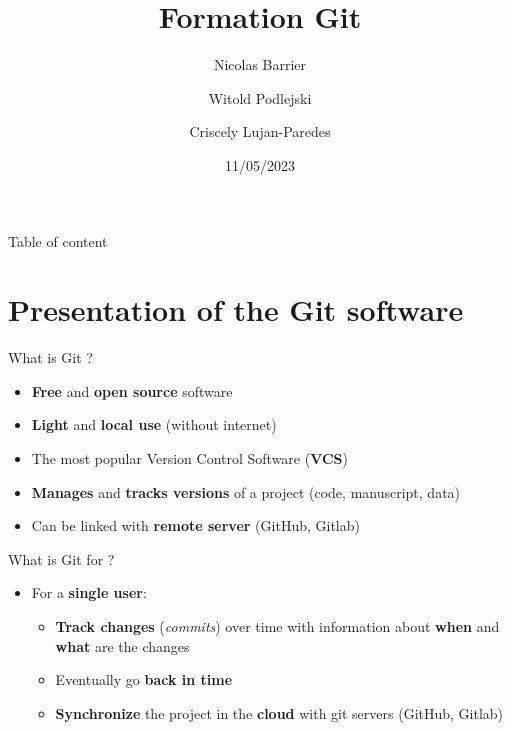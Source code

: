 \documentclass[10pt]{beamer}
\title{Formation Git}
\date{11/05/2023}
\author{Nicolas Barrier \and Witold Podlejski \and Criscely
Lujan-Paredes}
\date{}
\begin{document}
\frame{\titlepage}
\ifdefined\Shaded\renewenvironment{Shaded}{\begin{tcolorbox}[sharp corners, frame hidden, boxrule=0pt, breakable, borderline west={3pt}{0pt}{shadecolor}, enhanced, interior hidden]}{\end{tcolorbox}}\fi


\begin{frame}{Table of content}
\protect\hypertarget{table-of-content}{}
 \tableofcontents
\end{frame}


\section{Presentation of the Git software}

\begin{frame}{What is Git ?}
\protect\hypertarget{what-is-git}{}
\begin{itemize}
\item
  \textbf{Free} and \textbf{open source} software
\item
  \textbf{Light} and \textbf{local use} (without internet)
\item
  The most popular Version Control Software (\textbf{VCS})
\item
  \textbf{Manages} and \textbf{tracks versions} of a project (code,
  manuscript, data)
\item
  Can be linked with \textbf{remote server} (GitHub, Gitlab)
\end{itemize}
\end{frame}

\begin{frame}{What is Git for ?}
\protect\hypertarget{what-is-git-for}{}
\begin{itemize}
\item
  For a \textbf{single user}:

  \begin{itemize}
  \item
    \textbf{Track changes} (\emph{commits}) over time with information about \textbf{when} and \textbf{what} are the changes
  \item
    Eventually go \textbf{back in time}
  \item
    \textbf{Synchronize} the project in the \textbf{cloud} with git servers
    (GitHub, Gitlab)
  \end{itemize}
\end{itemize}
\end{frame}
\end{document}
